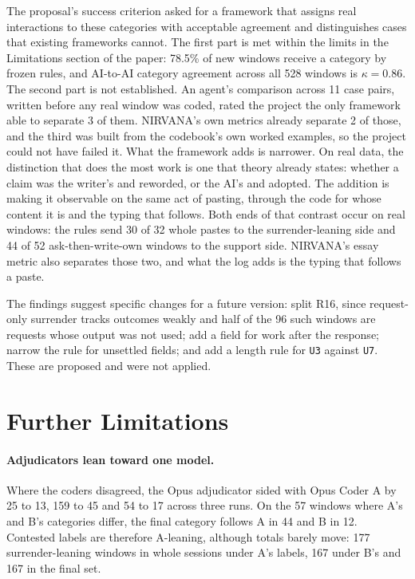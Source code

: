 \documentclass[manuscript,screen]{acmart}
\newcommand{\code}[1]{\texttt{#1}}
\begin{document}
The proposal's success criterion asked for a framework that assigns real interactions to these categories with acceptable agreement and distinguishes cases that existing frameworks cannot. The first part is met within the limits in the Limitations section of the paper: 78.5\% of new windows receive a category by frozen rules, and AI-to-AI category agreement across all 528 windows is $\kappa = 0.86$. The second part is not established. An agent's comparison across 11 case pairs, written before any real window was coded, rated the project the only framework able to separate 3 of them. NIRVANA's own metrics already separate 2 of those, and the third was built from the codebook's own worked examples, so the project could not have failed it. What the framework adds is narrower. On real data, the distinction that does the most work is one that theory already states: whether a claim was the writer's and reworded, or the AI's and adopted. The addition is making it observable on the same act of pasting, through the code for whose content it is and the typing that follows. Both ends of that contrast occur on real windows: the rules send 30 of 32 whole pastes to the surrender-leaning side and 44 of 52 ask-then-write-own windows to the support side. NIRVANA's essay metric also separates those two, and what the log adds is the typing that follows a paste.

The findings suggest specific changes for a future version: split R16, since request-only surrender tracks outcomes weakly and half of the 96 such windows are requests whose output was not used; add a field for work after the response; narrow the rule for unsettled fields; and add a length rule for \code{U3} against \code{U7}. These are proposed and were not applied.

\section{Further Limitations}

\paragraph{Adjudicators lean toward one model.} Where the coders disagreed, the Opus adjudicator sided with Opus Coder A by 25 to 13, 159 to 45 and 54 to 17 across three runs. On the 57 windows where A's and B's categories differ, the final category follows A in 44 and B in 12. Contested labels are therefore A-leaning, although totals barely move: 177 surrender-leaning windows in whole sessions under A's labels, 167 under B's and 167 in the final set.
\end{document}
